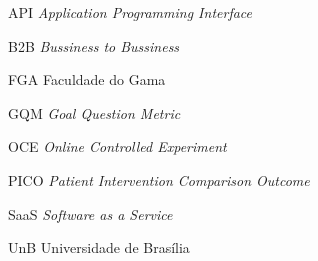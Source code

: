 \begin{siglas}

\item [API] \textit{Application Programming Interface}
\item [B2B] \textit{Bussiness to Bussiness}
\item [FGA] Faculdade do Gama
\item [GQM] \textit{Goal Question Metric}
\item [OCE] \textit{Online Controlled Experiment}
\item [PICO] \textit{Patient Intervention Comparison Outcome}
\item [SaaS] \textit{Software as a Service}
\item [UnB] Universidade de Brasília


\end{siglas}